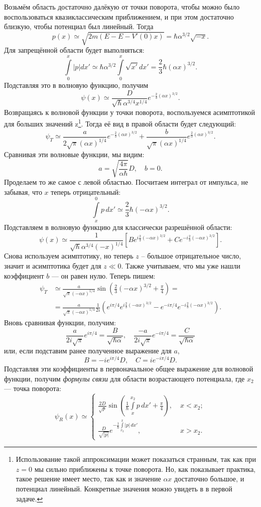 Возьмём область достаточно далёкую от точки поворота, чтобы можно было
воспользоваться квазиклассическим приближением, и при этом достаточно близкую,
чтобы потенциал был линейный. Тогда
\[
  p(x) \simeq \sqrt{2m (E - E - V'(0)x)} = \hbar\alpha^{3/2}\sqrt{-x}.
\]
Для запрещённой области будет выполняться:
\[
  \int\limits_{0}^{x}|p|dx' \simeq \hbar\alpha^{3/2}\int\limits_{0}^{x} \sqrt{x'}dx' = \frac{2}{3}\hbar(\alpha x)^{3/2}.
\]
Подставляя это в волновую функцию, получим
\[
  \psi(x) \simeq \frac{D}{\sqrt{\hbar}\alpha^{3/4}x^{1/4}}e^{-\frac{2}{3}(\alpha x)^{3/2}}.
\]
Возвращаясь к волновой функции у точки поворота, воспользуемся асимптотикой для
больших значений z\footnote{Использование такой аппроксимации может показаться
  странным, так как при $z=0$ мы сильно приближены к точке поворота. Но, как
  показывает практика, такое решение имеет место, так как и значение $\alpha x$
  достаточно большое, и потенциал линейный. Конкретные значения можно увидеть в
   в первой задаче.}. Тогда её вид в правой области будет
следующий:
\[
  \psi_T \simeq \frac{a}{2\sqrt{\pi} (\alpha x)^{1/4}}e^{-\frac{2}{3}(\alpha x)^{3/2}} +  \frac{b}{\sqrt{\pi} (\alpha x)^{1/4}}e^{\frac{2}{3}(\alpha x)^{3/2}}.
\]
Сравнивая эти волновые функции, мы видим:
\[
  a = \sqrt{\frac{4\pi}{\alpha \hbar}}D, \quad b = 0.
\]
Проделаем то же самое с левой областью. Посчитаем интеграл от импульса, не
забывая, что $x$ теперь отрицательный:
\[
  \int\limits_{x}^{0}p\, dx' \simeq \frac{2}{3}\hbar(-\alpha x)^{3/2}.
\]
Подставляем в волновую функцию для классически разрешённой области:
\[
  \psi(x) \simeq \frac{1}{\sqrt{\hbar}\alpha^{3/4}(-x)^{1/4}}\left[Be^{i\frac{2}{3}(-\alpha x)^{3/2}}+ Ce^{-i\frac{2}{3}(-\alpha x)^{3/2}}\right].
\]
Снова используем асимптотику, но теперь $z$ -- большое отрицательное число,
значит и асимптотика будет для $z \ll 0$. Также учитываем, что мы уже нашли
коэффициент $b$ --- он равен нулю. Теперь пишем:
\begin{align*}
  \psi_T & \simeq \frac{a}{\sqrt{\pi}(-\alpha x)^{1/4}}\sin\left(\frac{2}{3}(-\alpha x)^{3/2} + \frac{\pi}{4}\right) = \\
  & = \frac{a}{\sqrt{\pi}(-\alpha x)^{1/4}}\frac{1}{2i}\left( e^{i\pi/4}e^{i\frac{2}{3}(-\alpha x)^{3/2}} - e^{-i\pi/4}e^{-i\frac{2}{3}(-\alpha x)^{3/2}}\right).
\end{align*}
Вновь сравнивая функции, получим:
\[
  \frac{a}{2i\sqrt{\pi}}e^{i\pi/4} = \frac{B}{\sqrt{\hbar \alpha}}, \quad \frac{-a}{2i\sqrt{\pi}}e^{-i\pi/4} = \frac{C}{\sqrt{\hbar \alpha}}
\]
или, если подставим ранее полученное выражение для $a$,
\[
  B = -ie^{i\pi/4}D, \quad C = ie^{-i\pi/4}D.
\]
Подставляя эти коэффициенты в первоначальное общее выражение для волновой
функции, получим \textit{формулы связи} для области возрастающего потенциала,
где $x_2$ --- точка поворота:
\[
  \psi_R(x) \simeq
  \begin{cases}
    \frac{2D}{\sqrt{p}}\sin\left( \frac{1}{\hbar} \int\limits_x^{x_2} p\,dx' + \frac{\pi}{4} \right), \; &x < x_2;\\
    \frac{D}{\sqrt{|p|}}e^{-\frac{1}{\hbar} \int\limits_{x_2}^{x} |p|\,dx'},\;  &x > x_2.
  \end{cases}
\]

